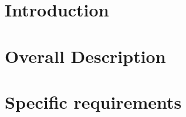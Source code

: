 \documentclass[11pt,a4paper,titlepage]{article}
\begin{document}




\section{Introduction}
\label{intro}



\section{Overall Description}
\label{description}



\section{Specific requirements}
\label{requirements}



\label{appendix}


\printindex
\end{document}

